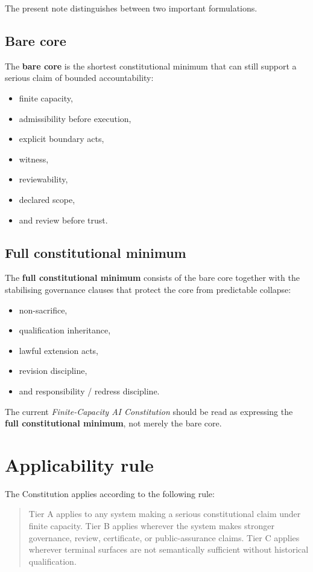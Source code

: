 \documentclass[11pt]{article}
\begin{document}
The present note distinguishes between two important formulations.

\subsection{Bare core}

The \textbf{bare core} is the shortest constitutional minimum that can still support a serious claim of bounded accountability:
\begin{itemize}[leftmargin=2em]
    \item finite capacity,
    \item admissibility before execution,
    \item explicit boundary acts,
    \item witness,
    \item reviewability,
    \item declared scope,
    \item and review before trust.
\end{itemize}

\subsection{Full constitutional minimum}

The \textbf{full constitutional minimum} consists of the bare core together with the stabilising governance clauses that protect the core from predictable collapse:
\begin{itemize}[leftmargin=2em]
    \item non-sacrifice,
    \item qualification inheritance,
    \item lawful extension acts,
    \item revision discipline,
    \item and responsibility / redress discipline.
\end{itemize}

The current \emph{Finite-Capacity AI Constitution} should be read as expressing the \textbf{full constitutional minimum}, not merely the bare core.

\section{Applicability rule}

The Constitution applies according to the following rule:

\begin{quote}
Tier A applies to any system making a serious constitutional claim under finite capacity. Tier B applies wherever the system makes stronger governance, review, certificate, or public-assurance claims. Tier C applies wherever terminal surfaces are not semantically sufficient without historical qualification.
\end{quote}
\end{document}
